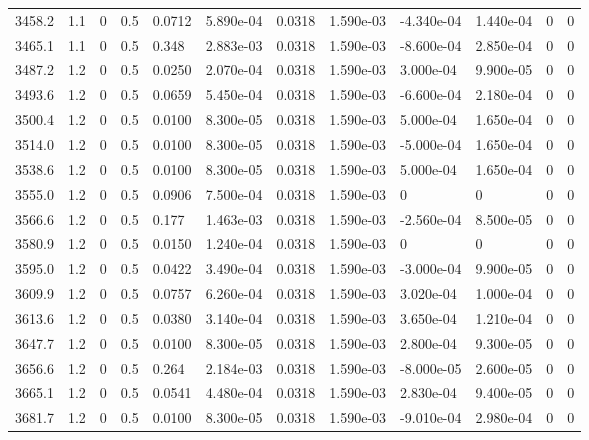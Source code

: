 \documentclass[preview]{standalone}
\begin{document}
{{{{{{{{\begin{tabular}{L{1.2cm}C{1.2cm} C{0.3cm}C{0.5cm} C{1.4cm}C{1.4cm} C{1.4cm}C{1.4cm} C{1.6cm}C{1.6cm} C{1.6cm}C{1.6cm}}
  3458.2  &   1.1  & 0     & 0.5 &  0.0712  & 5.890e-04  &  0.0318&   1.590e-03& -4.340e-04 & 1.440e-04   &  0 & 0  \\ 
  3465.1  &   1.1  & 0     & 0.5 &  0.348  & 2.883e-03  &  0.0318&   1.590e-03& -8.600e-04 & 2.850e-04   &  0 & 0  \\ 
  3487.2  &   1.2  & 0     & 0.5 &  0.0250  & 2.070e-04  &  0.0318&   1.590e-03& 3.000e-04 & 9.900e-05   &  0 & 0  \\ 
  3493.6  &   1.2  & 0     & 0.5 &  0.0659  & 5.450e-04  &  0.0318&   1.590e-03& -6.600e-04 & 2.180e-04   &  0 & 0  \\ 
  3500.4  &   1.2  & 0     & 0.5 &  0.0100  & 8.300e-05  &  0.0318&   1.590e-03& 5.000e-04 & 1.650e-04   &  0 & 0  \\ 
  3514.0  &   1.2  & 0     & 0.5 &  0.0100  & 8.300e-05  &  0.0318&   1.590e-03& -5.000e-04 & 1.650e-04   &  0 & 0  \\ 
  3538.6  &   1.2  & 0     & 0.5 &  0.0100  & 8.300e-05  &  0.0318&   1.590e-03& 5.000e-04 & 1.650e-04   &  0 & 0  \\ 
  3555.0  &   1.2  & 0     & 0.5 &  0.0906  & 7.500e-04  &  0.0318&   1.590e-03& 0 & 0   &  0 & 0  \\ 
  3566.6  &   1.2  & 0     & 0.5 &  0.177  & 1.463e-03  &  0.0318&   1.590e-03& -2.560e-04 & 8.500e-05   &  0 & 0  \\ 
  3580.9  &   1.2  & 0     & 0.5 &  0.0150  & 1.240e-04  &  0.0318&   1.590e-03& 0 & 0   &  0 & 0  \\ 
  3595.0  &   1.2  & 0     & 0.5 &  0.0422  & 3.490e-04  &  0.0318&   1.590e-03& -3.000e-04 & 9.900e-05   &  0 & 0  \\ 
  3609.9  &   1.2  & 0     & 0.5 &  0.0757  & 6.260e-04  &  0.0318&   1.590e-03& 3.020e-04 & 1.000e-04   &  0 & 0  \\ 
  3613.6  &   1.2  & 0     & 0.5 &  0.0380  & 3.140e-04  &  0.0318&   1.590e-03& 3.650e-04 & 1.210e-04   &  0 & 0  \\ 
  3647.7  &   1.2  & 0     & 0.5 &  0.0100  & 8.300e-05  &  0.0318&   1.590e-03& 2.800e-04 & 9.300e-05   &  0 & 0  \\ 
  3656.6  &   1.2  & 0     & 0.5 &  0.264  & 2.184e-03  &  0.0318&   1.590e-03& -8.000e-05 & 2.600e-05   &  0 & 0  \\ 
  3665.1  &   1.2  & 0     & 0.5 &  0.0541  & 4.480e-04  &  0.0318&   1.590e-03& 2.830e-04 & 9.400e-05   &  0 & 0  \\ 
  3681.7  &   1.2  & 0     & 0.5 &  0.0100  & 8.300e-05  &  0.0318&   1.590e-03& -9.010e-04 & 2.980e-04   &  0 & 0  \\ 

\end{tabular}}}}}}}}}
\end{document}
